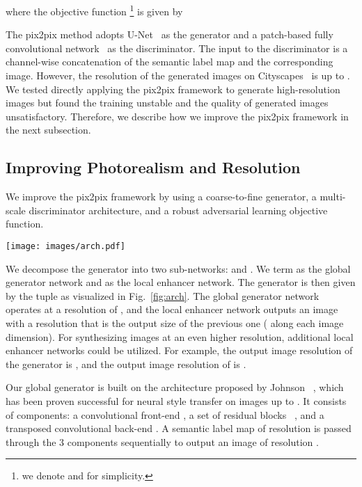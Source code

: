\documentclass[10pt,twocolumn,letterpaper]{article}
\newcommand{\reffig}[1]{Fig.~\ref{fig:#1}}
\newcommand{\lblfig}[1]{\label{fig:#1}}
\newcommand{\lblsec}[1]{\label{sec:#1}}
\newcommand{\pp}{pix2pix\xspace}
\begin{document}
where the objective function 
\footnote{we denote  and  for simplicity.}
 is given by 

The \pp method adopts U-Net~\cite{ronneberger2015u} as the generator and a patch-based fully convolutional network~\cite{long2015fully} as the discriminator. The input to the discriminator is a channel-wise concatenation of the semantic label map and the corresponding image. 
However, the resolution of the generated images on Cityscapes~\cite{Cordts2016cityscapes} is up to . We tested directly applying the \pp framework to generate high-resolution images but found the training unstable and the quality of generated images unsatisfactory. Therefore, we describe how we improve the \pp framework in the next subsection.

\subsection{Improving Photorealism and Resolution} \lblsec{alg:resolution}
We improve the \pp framework by using a coarse-to-fine generator, a multi-scale discriminator architecture, and a robust adversarial learning objective function.

\begin{figure*}[ht!]
  \centering
  \texttt{[image: images/arch.pdf]}   
  \caption{Network architecture of our generator. We first train a residual network  on lower resolution images. Then, another residual network  is appended to  and the two networks are trained jointly on high resolution images. Specifically, the input to the residual blocks in  is the element-wise sum of the feature map from  and the last feature map from .}
  \lblfig{arch}
\end{figure*}

 We decompose the generator into two sub-networks:  and . We term  as the global generator network and  as the local enhancer network. The generator is then given by the tuple   as visualized in \reffig{arch}. The global generator network operates at a resolution of , and the local enhancer network outputs an image with a resolution that is  the output size of the previous one ( along each image dimension). For synthesizing images at an even higher resolution, additional local enhancer networks could be utilized. For example, the output image resolution of the generator  is , and the output image resolution of  is .

Our global generator is built on the architecture proposed by Johnson \etal~\cite{johnson2016perceptual}, which has been proven successful for neural style transfer on images up to . It consists of  components: a convolutional front-end , a set of residual blocks ~\cite{he2016deep}, and a transposed convolutional back-end . A semantic label map of resolution  is passed through the 3 components sequentially to output an image of resolution .
\end{document}
